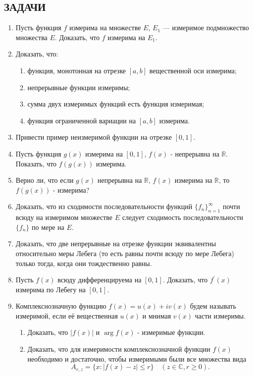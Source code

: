 \documentclass[12pt,a4paper]{article}
\begin{document}
\subsection*{ЗАДАЧИ}
\begin{enumerate}
\item Пусть функция $f$ измерима на множестве $E$, $E_{1}$ — измеримое подмножество множества $E$. Доказать, что $f$ измерима на $E_{1}$.

\item Доказать, что:
\begin{enumerate}[label=\alph*)]
\item функция, монотонная на отрезке $[a, b]$ вещественной оси измерима;
\item непрерывные функции измеримы;
\item сумма двух измеримых функций есть функция измеримая;
\item функция ограниченной вариации на $[a, b]$ измерима.
\end{enumerate}

\item Привести пример неизмеримой функции на отрезке $[0, 1]$.

\item Пусть функция $g(x)$ измерима на $[0,1]$, $f(x)$ - непрерывна на $\mathbb{R}$. Показать, что $f(g(x))$ измерима.

\item Верно ли, что если $g(x)$ непрерывна на $\mathbb{R}$, $f(x)$ измерима на $\mathbb{R}$, то $f(g(x))$ - измерима?

\item Доказать, что из сходимости последовательности функций $\{f_{n}\}_{n=1}^{\infty}$ почти всюду на измеримом множестве $E$ следует сходимость последовательности $\{f_{n}\}$ по мере на $E$.

\item Доказать, что две непрерывные на отрезке функции эквивалентны относительно меры Лебега (то есть равны почти всюду по мере Лебега) только тогда, когда они тождественно равны.

\item Пусть $f(x)$ всюду дифференцируема на $[0,1]$. Доказать, что $f^{\prime}(x)$ измерима по Лебегу на $[0, 1]$.

\item Комплекснозначную функцию $f(x) = u(x) + iv(x)$ будем называть измеримой, если её вещественная $u(x)$ и мнимая $v(x)$ части измеримы.
\begin{enumerate}[label=\alph*)]
\item Доказать, что $|f(x)|$ и $\arg f(x)$ - измеримые функции.
\item Доказать, что для измеримости комплекснозначной функции $f(x)$ необходимо и достаточно, чтобы измеримыми были все множества вида
$$A_{r,z} = \{x : |f(x) - z| \le r\} \quad (z \in \mathbb{C}, r \ge 0).$$
\end{enumerate}
\end{enumerate}
\end{document}
